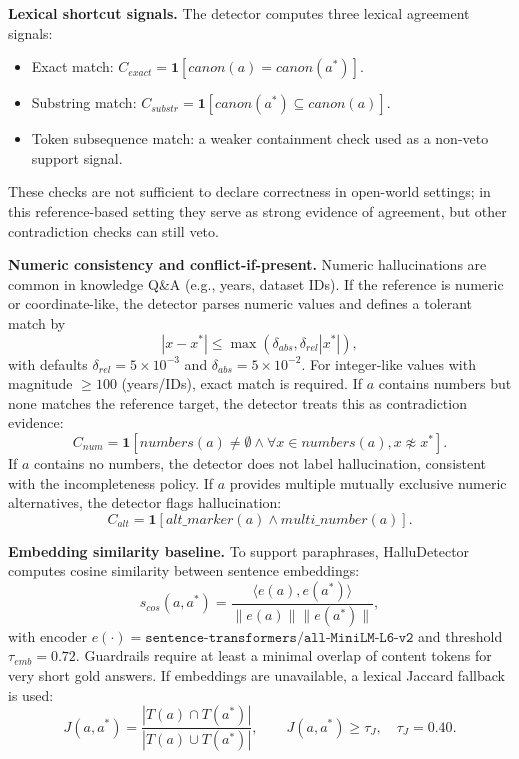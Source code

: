 \documentclass[11pt]{article}
\newcommand{\code}[1]{\texttt{#1}}
\begin{document}
\textbf{Lexical shortcut signals.} The detector computes three lexical agreement signals:
\begin{itemize}[leftmargin=1.5em]
\item Exact match: $C_{exact}=\mathbf{1}[canon(a)=canon(a^*)]$.
\item Substring match: $C_{substr}=\mathbf{1}[canon(a^*)\subseteq canon(a)]$.
\item Token subsequence match: a weaker containment check used as a non-veto support signal.
\end{itemize}
These checks are not sufficient to declare correctness in open-world settings; in this reference-based setting they serve as strong evidence of agreement, but other contradiction checks can still veto.

\textbf{Numeric consistency and conflict-if-present.} Numeric hallucinations are common in knowledge Q\&A (e.g., years, dataset IDs). If the reference is numeric or coordinate-like, the detector parses numeric values and defines a tolerant match by
\begin{equation}
|x-x^*| \leq \max(\delta_{abs}, \delta_{rel}|x^*|),
\tag{eq2}
\end{equation}
with defaults $\delta_{rel}=5\times 10^{-3}$ and $\delta_{abs}=5\times 10^{-2}$. For integer-like values with magnitude $\geq 100$ (years/IDs), exact match is required. If $a$ contains numbers but none matches the reference target, the detector treats this as contradiction evidence:
\begin{equation}
C_{num}=\mathbf{1}[numbers(a)\neq\emptyset \land \forall x\in numbers(a), x\not\approx x^*].
\tag{eq3}
\end{equation}
If $a$ contains no numbers, the detector does not label hallucination, consistent with the incompleteness policy. If $a$ provides multiple mutually exclusive numeric alternatives, the detector flags hallucination:
\begin{equation}
C_{alt}=\mathbf{1}[alt\_marker(a) \land multi\_number(a)].
\tag{eq4}
\end{equation}

\textbf{Embedding similarity baseline.} To support paraphrases, HalluDetector computes cosine similarity between sentence embeddings:
\begin{equation}
s_{cos}(a,a^*) = \frac{\langle e(a),e(a^*)\rangle}{\|e(a)\|\|e(a^*)\|},
\tag{eq5}
\end{equation}
with encoder $e(\cdot)=\code{sentence-transformers/all-MiniLM-L6-v2}$ and threshold $\tau_{emb}=0.72$. Guardrails require at least a minimal overlap of content tokens for very short gold answers. If embeddings are unavailable, a lexical Jaccard fallback is used:
\begin{equation}
J(a,a^*)=\frac{|T(a)\cap T(a^*)|}{|T(a)\cup T(a^*)|}, \qquad J(a,a^*)\geq \tau_J, \quad \tau_J=0.40.
\tag{eq6}
\end{equation}
\end{document}
